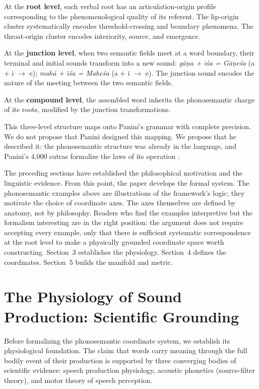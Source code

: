 \documentclass[12pt]{article}
\begin{document}
At the \textbf{root level}, each verbal root has an articulation-origin profile corresponding to the phenomenological quality of its referent. The lip-origin cluster systematically encodes threshold-crossing and boundary phenomena. The throat-origin cluster encodes interiority, source, and emergence.

At the \textbf{junction level}, when two semantic fields meet at a word boundary, their terminal and initial sounds transform into a new sound: \textit{g\={a}\d{n}a + \={\i}\'{s}a = G\={a}\d{n}e\'{s}a} (a + i $\to$ e); \textit{mah\={a} + \={\i}\'{s}a = Mahe\'{s}a} (a + i $\to$ e). The junction sound encodes the nature of the meeting between the two semantic fields.

At the \textbf{compound level}, the assembled word inherits the phonosemantic charge of its roots, modified by the junction transformations.

This three-level structure maps onto Panini's grammar with complete precision. We do not propose that Panini designed this mapping. We propose that he described it: the phonosemantic structure was already in the language, and Panini's 4,000 sutras formalize the laws of its operation \citep{cardona1997, kiparsky1982}.

The preceding sections have established the philosophical motivation and the linguistic evidence. From this point, the paper develops the formal system. The phonosemantic examples above are illustrations of the framework's logic; they motivate the choice of coordinate axes. The axes themselves are defined by anatomy, not by philosophy. Readers who find the examples interpretive but the formalism interesting are in the right position: the argument does not require accepting every example, only that there is sufficient systematic correspondence at the root level to make a physically grounded coordinate space worth constructing. Section~3 establishes the physiology. Section~4 defines the coordinates. Section~5 builds the manifold and metric.


\section{The Physiology of Sound Production: Scientific Grounding}

Before formalizing the phonosemantic coordinate system, we establish its physiological foundation. The claim that words carry meaning through the full bodily event of their production is supported by three converging bodies of scientific evidence: speech production physiology, acoustic phonetics (source-filter theory), and motor theory of speech perception.
\end{document}
